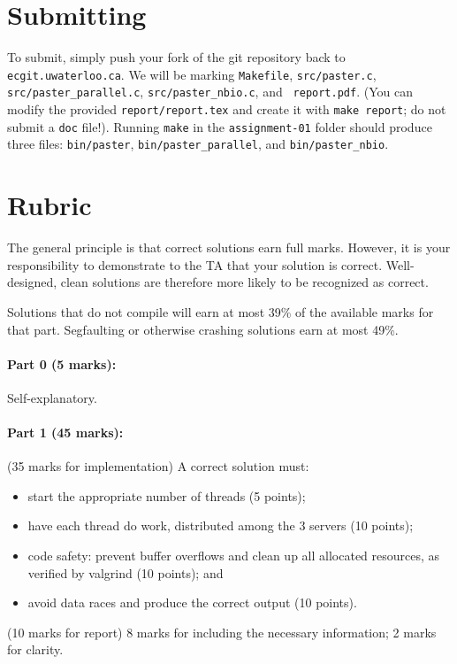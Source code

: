 \documentclass[letterpaper,10pt]{article}
\begin{document}
\section*{Submitting}

To submit, simply push your fork of the git repository back to {\tt ecgit.uwaterloo.ca}.
We will
be marking {\tt Makefile}, {\tt src/paster.c}, {\tt
  src/paster\_parallel.c}, {\tt src/paster\_nbio.c}, and {\tt
  report.pdf}. (You can modify the provided {\tt report/report.tex}
and create it with {\tt make report}; do not submit a {\tt doc}
file!). Running {\tt make} in the {\tt assignment-01} folder should
produce three files: {\tt bin/paster}, {\tt bin/paster\_parallel}, and
{\tt bin/paster\_nbio}. 

\section*{Rubric}
The general principle is that correct solutions earn full marks.
However, it is your responsibility to demonstrate to the TA
that your solution is correct. Well-designed, clean solutions 
are therefore more likely to be recognized as correct. 

Solutions that do not compile will earn at most 39\% of the available
marks for that part. Segfaulting or otherwise crashing solutions earn
at most 49\%.

\paragraph{Part 0 (5 marks):} Self-explanatory.

\paragraph{Part 1 (45 marks):} (35 marks for implementation) A correct solution must:
\begin{itemize}
\item start the appropriate number of threads (5 points);
\item have each thread do work, distributed among the 3 servers (10 points);
\item code safety: prevent buffer overflows and clean up all allocated resources, as verified by valgrind (10 points); and
\item avoid data races and produce the correct output (10 points).
\end{itemize}

\noindent (10 marks for report) 8 marks for including the necessary information; 2 marks
for clarity.
\end{document}
